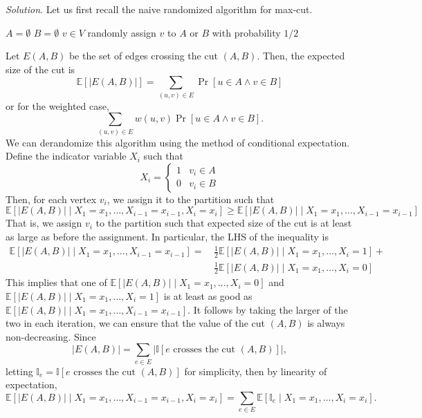 \documentclass[11pt]{article}
\newcommand{\Exp}{\mathbb{E}}
\begin{document}
\begin{enumerate}[leftmargin=16pt]
    \textit{Solution}. Let us first recall the naive randomized algorithm for max-cut.

    \begin{codebox}
        \li $A = \emptyset$
        \li $B = \emptyset$
        \li \For $v \in V$ \Do
            \li randomly assign $v$ to $A$ or $B$ with probability $1/2$      
    \end{codebox}
    Let $E(A,B)$ be the set of edges crossing the cut $(A,B)$. Then, the expected size of the cut is
    $$
    \Exp[|E(A,B)|] = \sum_{(u,v) \in E} \Pr[u \in A \land v \in B]
    $$
    or for the weighted case,
    $$
    \sum_{(u,v) \in E} w(u,v) \Pr[u \in A \land v \in B].
    $$
    We can derandomize this algorithm using the method of conditional expectation. Define the indicator variable $X_i$ such that
    $$
    X_i = \begin{cases}
        1 & v_i \in A \\
        0 & v_i \in B
    \end{cases}
    $$
    Then, for each vertex $v_i$, we assign it to the partition such that
    $$
    \Exp[|E(A,B)| \mid X_1 = x_1, \ldots, X_{i-1} = x_{i-1}, X_i = x_i] \geq \Exp[|E(A,B)| \mid X_1 = x_1, \ldots, X_{i-1} = x_{i-1}]
    $$
    That is, we assign $v_i$ to the partition such that expected size of the cut is at least as large as before the assignment. In particular, the LHS of the inequality is
    $$
    \begin{aligned}
        \Exp[|E(A,B)| \mid X_1 = x_1, \ldots, X_{i-1} = x_{i-1}] = \,& \frac{1}{2} \Exp[|E(A,B)| \mid X_1 = x_1, \ldots, X_i = 1] + \\
        & \frac{1}{2} \Exp[|E(A,B)| \mid X_1 = x_1, \ldots, X_i = 0]
    \end{aligned}
    $$
    This implies that one of $\Exp[|E(A,B)| \mid X_1 = x_1, \ldots, X_i = 0]$ and $\Exp[|E(A,B)| \mid X_1 = x_1, \ldots, X_i = 1]$ is at least as good as $\Exp[|E(A,B)| \mid X_1 = x_1, \ldots, X_{i-1} = x_{i-1}]$. It follows by taking the larger of the two in each iteration, we can ensure that the value of the cut $(A,B)$ is always non-decreasing. Since
    $$
    |E(A,B)| = \sum_{e \in E} | \mathbb{I}[\text{$e$ crosses the cut $(A,B)$}] |,
    $$
    letting $\mathbb{I}_e = \mathbb{I}[\text{$e$ crosses the cut $(A,B)$}]$ for simplicity, then by linearity of expectation,
    \begin{equation} \label{eq:exp-eab}
        \Exp[|E(A,B)| \mid X_1 = x_1, \ldots, X_{i-1} = x_{i-1}, X_i = x_i] = \sum_{e \in E} \Exp[\mathbb{I}_e \mid X_1 = x_1,\ldots, X_i = x_i ].

\end{equation}
\end{enumerate}
\end{document}
